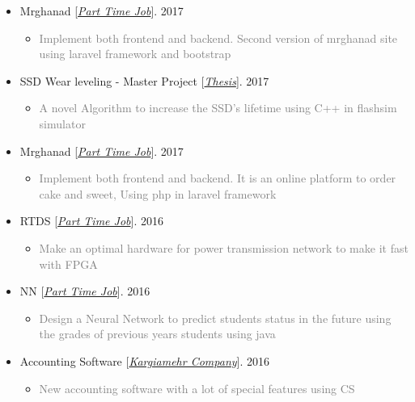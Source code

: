 \documentclass[10pt,a4paper,sans]{moderncv} %
\begin{document}
\begin{itemize}
		\item Mrghanad [\href{mailto:ma.mohammadizadeh@gmail.com}{\emph{Part Time Job}}]. \hfill 2017
		\begin{itemize}
			\item \textcolor{gray} {Implement both frontend and backend. Second version of mrghanad site using laravel framework and bootstrap}
		\end{itemize}

		\item SSD Wear leveling - Master Project [\href{https://sbu.ac.ir/Cols/CSE/Pages/default.aspx/}{\emph{Thesis}}]. \hfill 2017
		\begin{itemize}
			\item \textcolor{gray} {A novel Algorithm to increase the SSD’s lifetime using C++ in flashsim simulator}
		\end{itemize}

		\item Mrghanad [\href{mailto:ma.mohammadizadeh@gmail.com}{\emph{Part Time Job}}]. \hfill 2017
		\begin{itemize}
			\item \textcolor{gray} {Implement both frontend and backend. It is an online platform to order cake and sweet, Using php in laravel framework}
		\end{itemize}

		\item RTDS [\href{mailto:ma.mohammadizadeh@gmail.com}{\emph{Part Time Job}}]. \hfill 2016
		\begin{itemize}
			\item \textcolor{gray} {Make an optimal hardware for power transmission network to make it fast with FPGA}
		\end{itemize}

		\item NN [\href{mailto:ma.mohammadizadeh@gmail.com}{\emph{Part Time Job}}]. \hfill 2016
		\begin{itemize}
			\item \textcolor{gray} {Design a Neural Network to predict students status in the future using the grades of previous years students using java}
		\end{itemize}

		\item Accounting Software [\href{http://#/}{\emph{Kargiamehr Company}}]. \hfill 2016
		\begin{itemize}
			\item \textcolor{gray} {New accounting software with a lot of special features using CS}
		\end{itemize}


\end{itemize}
\end{document}
